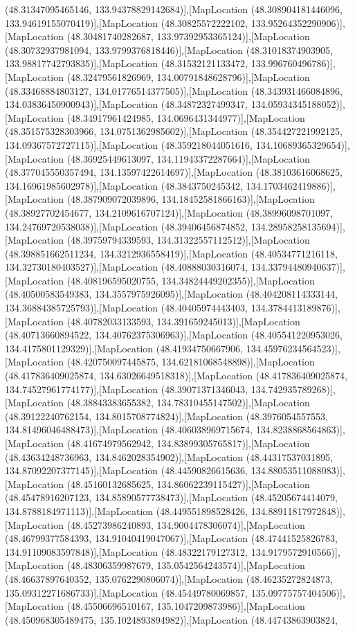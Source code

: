 (48.31347095465146, 133.94378829142684)],[MapLocation (48.308904181446096, 133.94619155070419)],[MapLocation (48.30825572222102, 133.95264352290906)],[MapLocation (48.30481740282687, 133.97392953365124)],[MapLocation (48.30732937981094, 133.9799376818446)],[MapLocation (48.31018374903905, 133.98817742793835)],[MapLocation (48.31532121133472, 133.996760496786)],[MapLocation (48.32479561826969, 134.00791848628796)],[MapLocation (48.33468884803127, 134.01776514377505)],[MapLocation (48.343931466084896, 134.03836450900943)],[MapLocation (48.34872327499347, 134.05934345188052)],[MapLocation (48.34917961424985, 134.0696431344977)],[MapLocation (48.351575328303966, 134.0751362985602)],[MapLocation (48.354427221992125, 134.09367572727115)],[MapLocation (48.359218044051616, 134.10689365329654)],[MapLocation (48.36925449613097, 134.11943372287664)],[MapLocation (48.377045550357494, 134.13597422614697)],[MapLocation (48.38103616068625, 134.16961985602978)],[MapLocation (48.3843750245342, 134.1703462419886)],[MapLocation (48.387909072039896, 134.18452581866163)],[MapLocation (48.38927702454677, 134.2109616707124)],[MapLocation (48.38996098701097, 134.24769720538038)],[MapLocation (48.39406456874852, 134.28958258135694)],[MapLocation (48.39759794339593, 134.31322557112512)],[MapLocation (48.398851662511234, 134.3212936558419)],[MapLocation (48.40534771216118, 134.32730180403527)],[MapLocation (48.40888030316074, 134.33794480940637)],[MapLocation (48.408196595020755, 134.34824449202355)],[MapLocation (48.40500583549383, 134.3557975926095)],[MapLocation (48.404208114333144, 134.36884385725793)],[MapLocation (48.40405974443403, 134.3784413189876)],[MapLocation (48.40782033133593, 134.391659245013)],[MapLocation (48.40713660894522, 134.40762375306963)],[MapLocation (48.405541220953026, 134.4175801129329)],[MapLocation (48.41934750667906, 134.45976234564523)],[MapLocation (48.420750097445875, 134.62181068548898)],[MapLocation (48.417836409025874, 134.63026649518318)],[MapLocation (48.417836409025874, 134.74527961774177)],[MapLocation (48.39071371346043, 134.742935789268)],[MapLocation (48.38843383655382, 134.78310455147502)],[MapLocation (48.39122240762154, 134.8015708774824)],[MapLocation (48.3976054557553, 134.81496046488473)],[MapLocation (48.406038969715674, 134.8238868564863)],[MapLocation (48.41674979562942, 134.83899305765817)],[MapLocation (48.43634248736963, 134.8462028354902)],[MapLocation (48.44317537031895, 134.87092207377145)],[MapLocation (48.44590826615636, 134.88053511088083)],[MapLocation (48.45160132685625, 134.86062239115427)],[MapLocation (48.45478916207123, 134.85890577738473)],[MapLocation (48.45205674414079, 134.8788184971113)],[MapLocation (48.449551898528426, 134.88911817972848)],[MapLocation (48.45273986240893, 134.9004478306074)],[MapLocation (48.46799377584393, 134.91040419047067)],[MapLocation (48.47441525826783, 134.91109083597848)],[MapLocation (48.48322179127312, 134.9179572910566)],[MapLocation (48.48306359987679, 135.0542564243574)],[MapLocation (48.46637897640352, 135.0762290806074)],[MapLocation (48.46235272824873, 135.09312271686733)],[MapLocation (48.45449780069857, 135.09775757404506)],[MapLocation (48.45506696510167, 135.1047209873986)],[MapLocation (48.450968305489475, 135.1024893894982)],[MapLocation (48.44743863903824, 